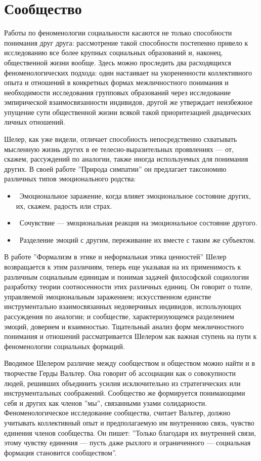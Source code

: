 \documentclass[11pt]{book}
\begin{document}
\section{Сообщество}

Работы по феноменологии социальности касаются не только способности понимания друг друга: рассмотрение такой способности постепенно привело к исследованию все более крупных социальных образований и, наконец, общественной жизни вообще. Здесь можно проследить два расходящихся феноменологических подхода: один настаивает на укорененности коллективного опыта и отношений в конкретных формах межличностного понимания и необходимости исследования групповых образований через исследование эмпирической взаимосвязанности индивидов, другой же утверждает неизбежное упущение сути общественной жизни всякой такой приоритезацией диадических личных отношений.

Шелер, как уже видели, отличает способность непосредственно схватывать мысленную жизнь других в ее телесно-выразительных проявлениях --- от, скажем, рассуждений по аналогии, также иногда используемых для понимания других. В своей работе ''Природа симпатии'' он предлагает таксономию различных типов эмоционального родства:

\begin{itemize}
  \item\ Эмоциональное заражение, когда влияет эмоциональное состояние других, их, скажем, радость или страх.
  \item\ Сочувствие --- эмоциональная реакция на эмоциональное состояние другого.
  \item\ Разделение эмоций с другим, переживание их вместе с таким же субъектом.
\end{itemize}

В работе ''Формализм в этике и неформальная этика ценностей'' Шелер возвращается к этим различиям, теперь еще указывая на их применимость к различным социальным единицам и понимая задачей философской социологии разработку теории соотносенности этих различных единиц. Он говорит о толпе, управляемой эмоциональным заражением; искусственном единстве инструментально взаимосвязанных недоверчивых индивидов, использующих рассуждения по аналогии; и сообществе, характеризующемся разделением эмоций, доверием и взаимностью. Тщательный анализ форм межличностного понимания и отношений рассматривается Шелером как важная ступень на пути к феноменологии социальных формаций.

Вводимое Шелером различие между сообществом и обществом можно найти и в творчестве Герды Вальтер. Она говорит об ассоциации как о совокупности людей, решивших объединить усилия исключительно из стратегических или инструментальных соображений. Сообщество же формируется понимающими себя и других как членов ''мы'', связанными узами солидарности. Феноменологическое исследование сообщества, считает Вальтер, должно учитывать коллективный опыт и предполагаемую им внутреннюю связь, чувство единения членов сообщества. Он пишет: ''Только благодаря их внутренней связи, этому чувству единения --- пусть даже рыхлого и ограниченного --- социальная формация становится сообществом''.
\end{document}
